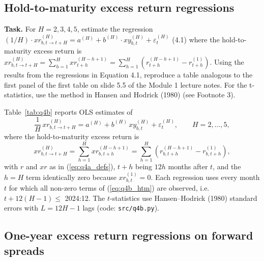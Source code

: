 \documentclass[11pt]{article}
\makeatletter
\newcommand{\xr}{\mathit{xr}}
\newcommand{\xy}{\mathit{xy}}
\newcommand{\task}[1]{\par\if@nobreak\else\needspace{5\baselineskip}\fi\medskip\noindent
  \begin{minipage}{\linewidth}\textbf{Task.} #1\end{minipage}\par   %
  \nopagebreak\medskip\@afterheading}   %
\makeatother
\begin{document}
\subsection{Hold-to-maturity excess return regressions}

\task{For $H = 2, 3, 4, 5$, estimate the regression
$(1/H) \cdot \xr^{(H)}_{b,t\to t+H} = a^{(H)} + b^{(H)} \cdot \xy^{(H)}_{b,t} + \varepsilon^{(H)}_t$
(4.1) where the hold-to-maturity excess return is
$\xr^{(H)}_{b,t\to t+H} = \sum_{h=1}^{H} \xr^{(H-h+1)}_{t+h}
= \sum_{h=1}^{H} (r^{(H-h+1)}_{t+h} - r^{(1)}_{t+h})$. Using the results from the regressions in
Equation 4.1, reproduce a table analogous to the first panel of the first table on slide 5.5 of
the Module 1 lecture notes. For the t-statistics, use the method in Hansen and Hodrick (1980)
(see Footnote 3).}

Table~\ref{tab:q4b} reports OLS estimates of
\begin{equation}
  \frac{1}{H}\,\xr^{(H)}_{b,t\to t+H} = a^{(H)} + b^{(H)}\,\xy^{(H)}_{b,t} + \varepsilon^{(H)}_t,
  \qquad H = 2, \dots, 5,
  \label{eq:q4b_regression}
\end{equation}
where the hold-to-maturity excess return is
\begin{equation}
  \xr^{(H)}_{b,t\to t+H} = \sum_{h=1}^{H} \xr^{(H-h+1)}_{b,t+h}
  = \sum_{h=1}^{H} \left( r^{(H-h+1)}_{b,t+h} - r^{(1)}_{b,t+h} \right),
  \label{eq:q4b_htm}
\end{equation}
with $r$ and $\xr$ as in (\ref{eq:q4a_defs}), $t+h$ being $12h$ months after $t$, and the
$h = H$ term identically zero because $\xr^{(1)}_{b,t} = 0$. Each regression uses every month
$t$ for which all non-zero terms of (\ref{eq:q4b_htm}) are observed, i.e.\ $t + 12(H-1) \le$
2024:12. The $t$-statistics use Hansen--Hodrick (1980) standard errors with $L = 12H - 1$
lags (code: \texttt{src/q4b.py}).

\begin{table}[H]
  \centering
  
  \caption{OLS estimates of $b^{(H)}$ in regression (\ref{eq:q4b_regression}), with
  Hansen--Hodrick (1980) $t$-statistics ($12H-1$ lags) in brackets and $R^2$ in percent.
  Monthly observations from 1952:06; the last predictor month is 2023:12, 2022:12, 2021:12
  and 2020:12 for $H = 2, 3, 4, 5$ (859, 847, 835 and 823 observations).}
  \label{tab:q4b}
\end{table}

\subsection{One-year excess return regressions on forward spreads}
\end{document}
